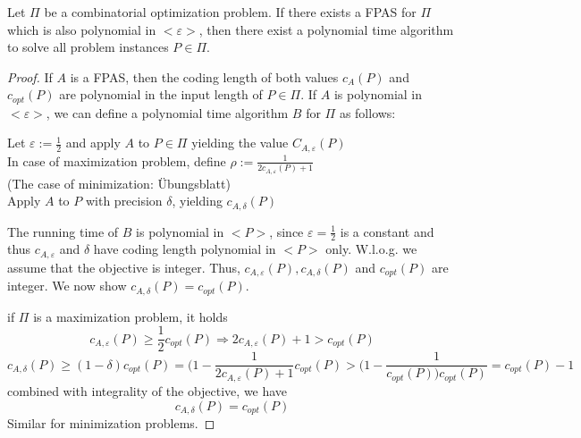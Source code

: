\begin{thm}
Let $\Pi$ be a combinatorial optimization problem. If there exists a FPAS for $\Pi$ which is also polynomial in $<\varepsilon>$, then there exist a polynomial time algorithm to solve all problem instances $P \in \Pi$.
\end{thm} 
\begin{proof}
If $A$ is a FPAS, then the coding length of both values $c_A(P)$ and $c_{opt}(P)$ are polynomial in the input length of $ P \in \Pi$. If $A$ is polynomial in $<\varepsilon>$, we can define a polynomial time algorithm $B$ for $\Pi$ as follows:

Let $\varepsilon := \frac 12$ and apply $A$ to $P \in \Pi$ yielding the value $C_{A,\varepsilon}(P)$ \\
In case of maximization problem, define $\rho:=\frac 1 {2 c_{A,\varepsilon}(P)+1}$ \\
(The case of minimization: Übungsblatt) \\
Apply $A$ to $P$ with precision $\delta$, yielding $c_{A,\delta}(P)$

The running time of $B$ is polynomial in $<P>$, since $\varepsilon=\frac 12$ is a constant and thus $c_{A,\varepsilon}$ and $\delta$ have coding length polynomial in $<P>$ only.
W.l.o.g. we assume that the objective is integer. Thus, $c_{A,\varepsilon}(P),c_{A,\delta}(P)$ and $c_{opt}(P)$ are integer. We now show $c_{A,\delta}(P)=c_{opt}(P)$.

if $\Pi$ is a maximization problem, it holds 
\[
  c_{A,\varepsilon}(P) \geq \frac 12 c_{opt}(P) \Rightarrow 2 c_{A,\varepsilon}(P)+1 > c_{opt}(P)
\]
\[
  c_{A,\delta}(P) \geq (1-\delta)c_{opt}(P)=(1-\frac {1}{2c_{A,\varepsilon}(P)+1} c_{opt}(P) > (1-\frac{1}{c_{opt}(P))c_{opt}(P)}=c_{opt}(P)-1
\]
combined with integrality of the objective, we have 
\[
  c_{A,\delta}(P)=c_{opt}(P)
\]
Similar for minimization problems.
\end{proof}


